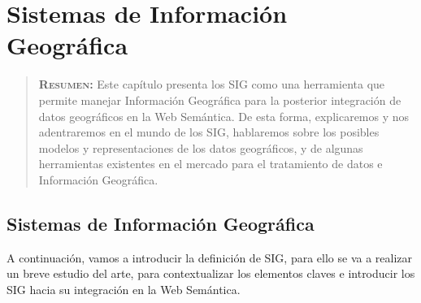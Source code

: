 

\chapter{Sistemas de Información Geográfica}
\label{ch:sig}

\begin{quote}
  	{\bf\textsc{Resumen:}} Este capítulo presenta los SIG como una herramienta que permite manejar Información Geográfica para la posterior integración de datos geográficos en la Web Semántica. De esta forma, explicaremos y nos adentraremos en el mundo de los SIG, hablaremos sobre los posibles modelos y representaciones de los datos geográficos, y de algunas herramientas existentes en el mercado para el tratamiento de datos e Información Geográfica.
\end{quote}


\section{Sistemas de Información Geográfica}

A continuación, vamos a introducir la definición de SIG, para ello se va a realizar un breve estudio del arte, para contextualizar los elementos claves e introducir los SIG hacia su integración en la Web Semántica.

